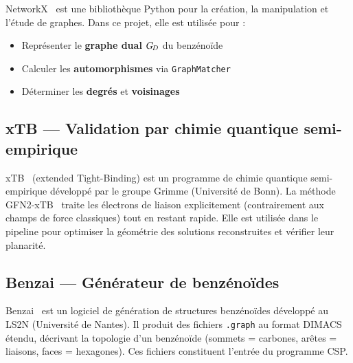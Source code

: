 \begin{definition}[NetworkX]
  NetworkX~\cite{networkx} est une bibliothèque Python pour la création, la manipulation et
  l'étude de graphes. Dans ce projet, elle est utilisée pour :
  \begin{itemize}
    \item Représenter le \textbf{graphe dual} $G_{\!D}$ du benzénoïde
    \item Calculer les \textbf{automorphismes} via \texttt{GraphMatcher}
    \item Déterminer les \textbf{degrés} et \textbf{voisinages}
  \end{itemize}
\end{definition}

\subsection{xTB — Validation par chimie quantique semi-empirique}

\begin{definition}[xTB]
  xTB~\cite{xtb} (extended Tight-Binding) est un programme de chimie quantique semi-empirique
  développé par le groupe Grimme (Université de Bonn). La méthode GFN2-xTB~\cite{gfn2xtb}
  traite les électrons de liaison explicitement (contrairement aux champs de force classiques)
  tout en restant rapide. Elle est utilisée dans le pipeline pour optimiser la géométrie des
  solutions reconstruites et vérifier leur planarité.
\end{definition}

\subsection{Benzai — Générateur de benzénoïdes}

\begin{definition}[Benzai]
  Benzai~\cite{benzai} est un logiciel de génération de structures benzénoïdes développé au
  LS2N (Université de Nantes). Il produit des fichiers \texttt{.graph} au format DIMACS étendu,
  décrivant la topologie d'un benzénoïde (sommets = carbones, arêtes = liaisons, faces =
  hexagones). Ces fichiers constituent l'entrée du programme CSP.
\end{definition}
